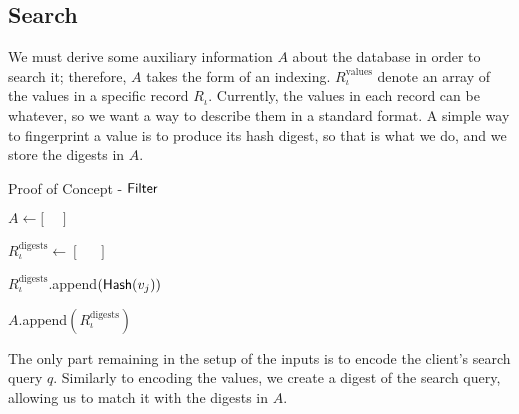 \subsection*{\thesubsection\quad Search}\label{subsec:ProofOfConceptSearching}


We must derive some auxiliary information $ A $ about the database in order to search it; therefore, $ A $ takes the form of an indexing. $ R^{\mathrm{values}}_{\iota} $ denote an array of the values in a specific record $ R_{\iota} $. Currently, the values in each record can be whatever, so we want a way to describe them in a standard format. A simple way to fingerprint a value is to produce its hash digest, so that is what we do, and we store the digests in $ A $.

\begin{algorithm}[tbh]
    \LinesNumbered
    \caption{Proof of Concept - $ \mathsf{{Filter}} $}
    \label{algo:Indexing}

    \vspace*{0.48cm}

    {$ A \gets \lbrack \phantom{=} \rbrack $}

     { 

        {$ R^{\mathrm{digests}}_{\iota} \gets \left[ \phantom{=} \right] $}

         {
            { $ R^{\mathrm{digests}}_{\iota} $.append$\left( \mathsf{Hash}{\left( v_j \right)}\right)$}
        }

        {$ A $.append$\left( R^{\mathrm{digests}}_{\iota} \right)$ }
    }

    \vspace*{0.48cm}

\end{algorithm}

The only part remaining in the setup of the inputs is to encode the client's search query $ q $. Similarly to encoding the values, we create a digest of the search query, allowing us to match it with the digests in $ A $.

